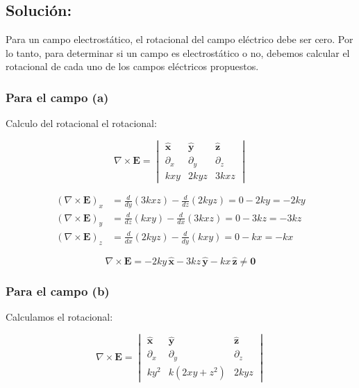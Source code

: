 \documentclass[12pt]{article}
\begin{document}
\subsection*{Solución:}
Para un campo electrostático, el rotacional del campo eléctrico debe ser cero. Por lo tanto, para determinar si un campo es electrostático o no, debemos calcular el rotacional de cada uno de los campos eléctricos propuestos.

\subsubsection*{Para el campo (a)}

Calculo del rotacional el rotacional:

\[
\nabla \times \mathbf{E} = 
\begin{vmatrix}
\hat{\mathbf{x}} & \hat{\mathbf{y}} & \hat{\mathbf{z}} \\
\partial_x & \partial_y & \partial_z \\
kxy & 2k yz & 3k xz
\end{vmatrix}
\]

\begin{align*}
(\nabla \times \mathbf{E})_x &= \frac{d}{dy} (3kxz) - \frac{d}{dz} (2kyz) = 0 - 2ky = -2ky \\
(\nabla \times \mathbf{E})_y &= \frac{d}{dz} (kxy) - \frac{d}{dx} (3kxz) = 0 - 3kz = -3kz \\
(\nabla \times \mathbf{E})_z &= \frac{d}{dx} (2kyz) - \frac{d}{dy} (kxy) = 0 - kx = -kx
\end{align*}

\[
\nabla \times \mathbf{E} = -2ky\,\hat{\mathbf{x}} - 3kz\,\hat{\mathbf{y}} - kx\,\hat{\mathbf{z}} \neq \mathbf{0}
\]






\subsubsection*{Para el campo (b)}
Calculamos el rotacional:

\[
\nabla \times \mathbf{E} = 
\begin{vmatrix}
\hat{\mathbf{x}} & \hat{\mathbf{y}} & \hat{\mathbf{z}} \\
\partial_x & \partial_y & \partial_z \\
ky^2 & k(2xy + z^2) & 2kyz
\end{vmatrix}
\]
\end{document}
